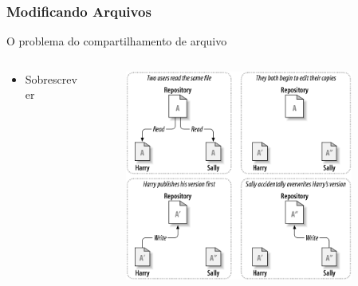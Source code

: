 \documentclass{beamer}
\begin{document}
\begin{frame}
    \frametitle{Modificando Arquivos}
    \begin{block}{O problema do compartilhamento de arquivo}
        \begin{columns}
            \begin{column}{.5\textwidth}
                \begin{itemize}
                    \item Sobrescrever
                \end{itemize}
            \end{column}
            \begin{column}{.5\textwidth}
                \begin{figure}
                    \includegraphics[width=0.9\textwidth]{figures/problem}
                \end{figure}
            \end{column}
        \end{columns}
    \end{block}
\end{frame}
\end{document}
